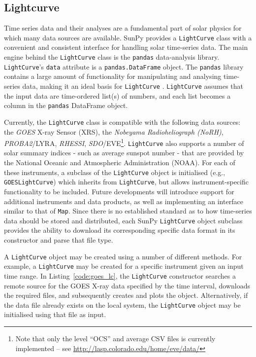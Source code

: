 \subsection{Lightcurve}\label{ssec:lightcurve}

Time series data and their analyses are a fundamental part of solar
physics for which many data sources are available.
SunPy provides a \texttt{LightCurve} class
with a convenient and consistent interface for handling solar time-series
data.  The main engine behind the \texttt{LightCurve} class is
the {\texttt{pandas}} data-analysis library.  
\texttt{LightCurve}'s \texttt{data} attribute is a \texttt{pandas.DataFrame} 
object. The \texttt{pandas} library contains a large amount
of functionality for manipulating and analysing time-series data,
making it an ideal basis for \texttt{LightCurve} \citep{mckinney2012}.  \texttt{LightCurve}
assumes that the input data are time-ordered list(s) of numbers, and each
list becomes a column in the \texttt{pandas} DataFrame object.

Currently, the \texttt{LightCurve} class is compatible with the
following data sources: the \textit{GOES} X-ray Sensor (XRS), the \textit{Nobeyama Radioheliograph (NoRH)}, \textit{PROBA2}/LYRA, \textit{RHESSI}, \textit{SDO}/EVE\footnote{Note that only the level ``OCS'' and
average CSV files is currently implemented -- see \url{http://lasp.colorado.edu/home/eve/data/}}. \texttt{LightCurve} also supports a number of solar summary indices - such as average sunspot number - that are provided by the National Oceanic and Atmospheric Administration (NOAA).  For each of these instruments, a subclass of the
\texttt{LightCurve} object is initialised
(e.g., \texttt{GOESLightCurve}) which inherits from
\texttt{LightCurve}, but allows instrument-specific functionality to be
included.  Future developments will introduce support for additional
instruments and data products, as well as implementing an interface 
similar to that of \texttt{Map}.  Since there is no established standard
as to how time-series data should be stored and distributed, each SunPy 
\texttt{LightCurve} object subclass provides the ability to download its corresponding 
specific data format in its constructor and parse that file type.

A \texttt{LightCurve} object may be created using a number of different methods. 
For example, a \texttt{LightCurve} may be created for a specific instrument given
an input time range. In Listing~\ref{code:goes_lc}, 
the \texttt{LightCurve} constructor searches a remote source for the GOES X-ray 
data specified by the time interval, downloads the required files, and 
subsequently creates and plots the object. Alternatively, if the data file 
already exists on the local system, the \texttt{LightCurve} object may be 
initialised using that file as input.

